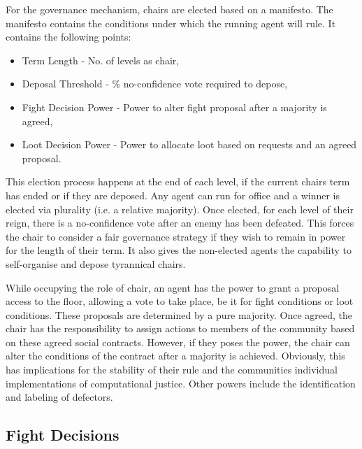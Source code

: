 
For the governance mechanism, chairs are elected based on a manifesto. The manifesto contains the conditions under which the running agent will rule. It contains the following points:

\begin{itemize}
    \item Term Length - No. of levels as chair,
    \item Deposal Threshold - \% no-confidence vote required to depose,
    \item Fight Decision Power - Power to alter fight proposal after a majority is agreed,
    \item Loot Decision Power - Power to allocate loot based on requests and an agreed proposal.
\end{itemize}

This election process happens at the end of each level, if the current chairs term has ended or if they are deposed. Any agent can run for office and a winner is elected via plurality (i.e. a relative majority). Once elected, for each level of their reign, there is a no-confidence vote after an enemy has been defeated. This forces the chair to consider a fair governance strategy if they wish to remain in power for the length of their term. It also gives the non-elected agents the capability to self-organise and depose tyrannical chairs. 

While occupying the role of chair, an agent has the power to grant a proposal access to the floor, allowing a vote to take place, be it for fight conditions or loot conditions. These proposals are determined by a pure majority. Once agreed, the chair has the responsibility to assign actions to members of the community based on these agreed social contracts. However, if they poses the power, the chair can alter the conditions of the contract after a majority is achieved. Obviously, this has implications for the stability of their rule and the communities individual implementations of computational justice. Other powers include the identification and labeling of defectors. 


\subsection{Fight Decisions}\label{sec: fight decision}

